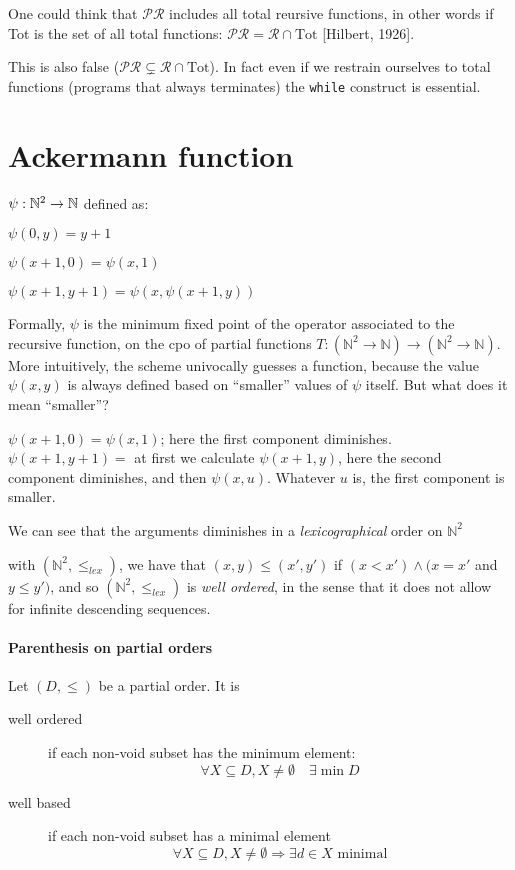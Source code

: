 One could think that $\mathcal{PR}$ includes all total reursive
functions, in other words if Tot is the set of all total functions:
$\mathcal{PR} = \mathcal{R} \cap \text{Tot}$ [Hilbert, 1926].

This is also false
($\mathcal{PR} \subsetneq \mathcal{R} \cap \text{Tot}$). In fact even
if we restrain ourselves to total functions (programs that always
terminates) the \texttt{while} construct is essential.

\section{Ackermann function}
$ \psi: \mathbb{N}^2 \rightarrow \mathbb{N} $ defined as:

$ \psi(0,y) = y+1 $

$ \psi(x+1,0) = \psi(x,1) $

$ \psi(x+1,y+1) = \psi(x, \psi(x+1, y)) $

Formally, $\psi$ is the minimum fixed point of the operator associated
to the recursive function, on the cpo %
of partial functions
$T: (\mathbb{N}^2 \rightarrow \mathbb{N}) \rightarrow (\mathbb{N}^2
\rightarrow \mathbb{N})$. More intuitively, the scheme univocally
guesses a function, because the value $\psi(x,y)$ is always defined
based on ``smaller'' values of $\psi$ itself. But what does it mean
``smaller''?

$\psi(x+1,0) = \psi(x,1)$; here the first component
diminishes. $\psi(x+1,y+1)=$ at first we calculate $\psi(x+1, y)$,
here the second component diminishes, and then $\psi(x,u)$. Whatever
$u$ is, the first component is smaller.

We can see that the arguments diminishes in a \emph{lexicographical}
order on $\mathbb{N}^2$

with $(\mathbb{N}^2, \leq_{lex} )$, we have that $(x,y) \leq (x', y')$
if $(x < x') \wedge (x=x'$ and $y \leq y')$, and so
$( \mathbb{N}^2, \leq_{lex} )$ is \emph{well ordered}, in the sense
that it does not allow for infinite descending sequences.

\paragraph{Parenthesis on partial orders}
\begin{definition}
  Let $(D, \leq)$ be a partial order. It is
  \begin{description}
  \item[well ordered] if each non-void subset has the minimum element:
    $$\forall X \subseteq D, X \neq \emptyset \quad \exists \min D$$
  \item[well based] if each non-void subset has a minimal element
    $$ \forall X \subseteq D, X \neq \emptyset \Rightarrow \exists d \in X \text{ minimal}$$
  \end{description}
\end{definition}

